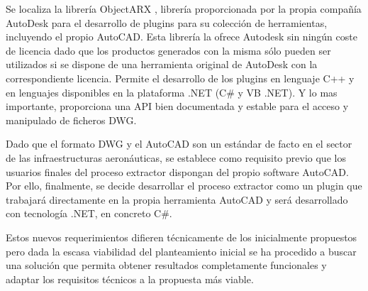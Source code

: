 Se localiza la librería ObjectARX \cite{ObjectARX}, librería proporcionada por la propia compañía AutoDesk para el desarrollo de plugins para su colección de herramientas, incluyendo el propio AutoCAD. Esta librería la ofrece Autodesk sin ningún coste de licencia dado que los productos generados con la misma sólo pueden ser utilizados si se dispone de una herramienta original de AutoDesk con la correspondiente licencia. Permite el desarrollo de los plugins en lenguaje C++ y en lenguajes disponibles en la plataforma .NET (C\# y VB .NET). Y lo mas importante, proporciona una API bien documentada y estable para el acceso y manipulado de ficheros DWG.

Dado que el formato DWG y el AutoCAD son un estándar de facto en el sector de las infraestructuras aeronáuticas, se establece como requisito previo que los usuarios finales del proceso extractor dispongan del propio software AutoCAD. Por ello, finalmente, se decide desarrollar el proceso extractor como un plugin que trabajará directamente en la propia herramienta AutoCAD y será desarrollado con tecnología .NET, en concreto C\#. 

Estos nuevos requerimientos difieren técnicamente de los inicialmente propuestos pero dada la escasa viabilidad del planteamiento inicial se ha procedido a buscar una solución que permita obtener resultados completamente funcionales y adaptar los requisitos técnicos a la propuesta más viable.

